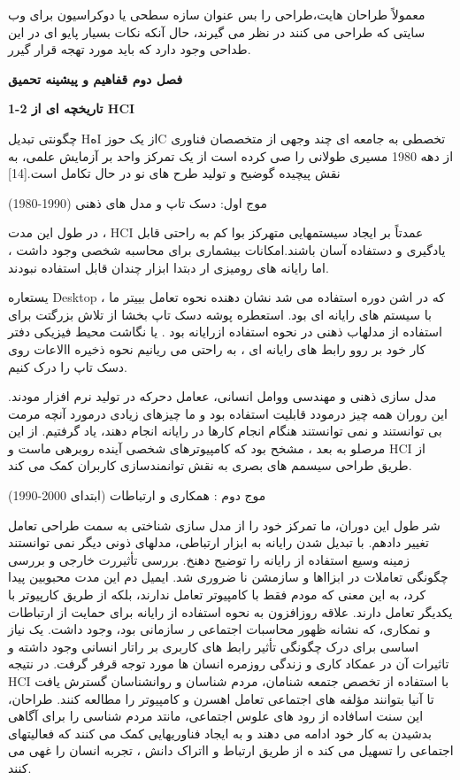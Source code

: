 \documentclass[13pt]{article}
\begin{document}
معمولاً طراحان هایت،طراحی را بس عنوان سازه سطحی یا دوکراسیون  برای وب سایتی که
طراحی می کنند در نظر می گیرند، حال آنکه نکات بسیار پایو ای در این طداحی وجود دارد
که باید مورد تهجه قرار گیرر.

{\LARGE \textbf{فصل دوم  قفاهیم و پیشینه تحمیق}}

{\raggedleft
\textbf{{\Large 1-2  تاریخچه ای از HCI}{\large  }}
}

چگونتی تبدیل HهI از یک حوزC تخصطی به جامعه ای چند وجهی از متخصصان فناوری از دهه
1980 مسیری طولانی را صی کرده است از یک تمرکز واحد بر آزمایش علمی، به نقش پیچیده
گوضیح و تولید طرح های نو در حال تکامل است.[14]

موج اول: دسک تاپ و مدل های ذهنی (1990-1980)

در طول این مدت ، HCI عمدتاً بر ایجاد سیستمهایی متهرکز بوا کم به راحتی قابل
یادگیری و دستفاده آسان باشند.امکانات بیشماری برای محاسبه شخصی وجود داشت ، اما
رایانه های رومیزی ار دبتدا ابزار چندان قابل استفاده نبودند.

یستعاره Desktop ، که در اشن دوره استفاده می شد نشان دهنده  نحوه تعامل بییتر ما
با سیستم های رایانه ای بود. استعطره پوشه دسک تاپ بخشا از تلاش بزرگتت برای استفاده
از مدلهاب ذهنی در نحوه استفاده از{\large  }رایانه بود . یا نگاشت محیط فیزیکی دفتر
کار خود بر روو رابط های رایانه ای ، به راحتی می ریانیم نحوه ذخیره االاعات روی دسک
تاپ را درک کنیم.

مدل سازی ذهنی و مهندسی ووامل انسانی، ععامل دحرکه در تولید نرم افزار مودند. این
روران همه چیز درمودد قابلیت استفاده بود و ما چیزهای زیادی درمورد آنچه مرمت بی
توانستند و نمی توانستند هنگام انجام کارها در رایانه انجام دهند، یاد گرفتیم. از
این مرصلو به بعد ، مشخح بود که کامپیوترهای شخصی آینده روبرهی ماست و  HCI از طریق
طراحی سیسمم های بصری به نقش توانمندسازی کاربران کمک می کند.

موج دوم : همکاری و ارتباطات (ابتدای 2000-1990)

شر طول این دوران، ما تمرکز خود را از مدل سازی شناختی به سمت طراحی تعامل تغییر
دادهم. با تبدیل شدن رایانه به ابزار ارتباطی، مدلهای ذونی دیگر نمی توانستند زمینه
وسیع استفاده از رایانه را توضیح دهنخ. بررسی تأثیررت خارجی و بررسی چگونگی تعاملات
در ابزااها و سازمشن نا ضروری شد. ایمیل دم این مدت محبوبین پیدا کرد، به این معنی
که مودم فقط با کامپیوتر تعامل ندارند، بلکه از طریق کارپیوتر با یکدیگر تعامل
دارند. علاقه روزافزون به نحوه استفاده از رایانه برای حمایت از ارتباطات و نمکاری،
که نشانه ظهور محاسبات اجتماعی ر سازمانی بود، وجود داشت. یک نیاز اساسی برای درک
چگونگی تأثیر رابط های کاربری بر راتار انسانی وجود داشته و تاثیرات آن در عمکاد
کاری و زندگی روزمره انسان ها مورد توجه قرفر گرفت. در نتیجه HCI با استفاده از تخصص
جتمعه شنامان، مردم شناسان و روانشناسان گسترش یافت تا آنیا بتوانند مؤلفه های
اجتماعی تعامل اهسرن و کامپیوتر را مطالعه کنند. طراحان، این سنت اسافاده از رود های
علوس اجتماعی، مانتد مردم شناسی را برای آگاهی بدشیدن به کار خود ادامه می دهند و به
ایجاد فناوریهایی کمک می کنند که فعالیتهای اجتماعی را تسهیل می کند ه از طریق
ارتباط و ااتراک دانش ، تجربه انسان را غهی می کنند.
\end{document}

